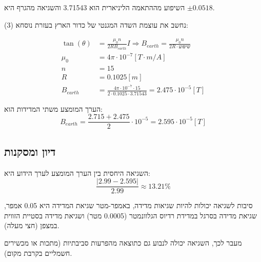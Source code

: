 \documentclass[14pt]{extarticle}
\begin{document}
השיפוע מההתאמה הליניארית הוא 3.71543 והשגיאה מהגרף היא $±0.0518$.

נחשב את עוצמת השדה המגנטי של כדור הארץ בעזרת נוסחא (3):
\begin{center}
    \begin{equation*}
        \begin{aligned}
            \tan(\theta) & = \frac{\mu_0 n}{2R B_{earth}}I \Rightarrow B_{earth} = \frac{\mu_0 n}{2R \cdot \text{שיפוע}} \\
            \mu_0        & = 4\pi \cdot 10^{-7} [T \cdot m/A]                                                            \\
            n            & = 15                                                                                          \\
            R            & = 0.1025 [m]                                                                                  \\
            B_{earth}    & = \frac{4\pi \cdot 10^{-7} \cdot 15}{2 \cdot 0.1025 \cdot 3.71543} = 2.475 \cdot 10^{-5} [T]
        \end{aligned}
    \end{equation*}
\end{center}

הערך המומצע משתי המדידות הוא:
\begin{equation*}
    B_{earth} = \frac{2.715 + 2.475}{2} \cdot 10^{-5} = 2.595 \cdot 10^{-5} [T]
\end{equation*}

\subsection{דיון ומסקנות}

השגיאה היחסית בין הערך המומצע לערך הידוע היא:
\begin{equation*}
    \frac{|2.99 - 2.595|}{2.99} \approx 13.21 \%
\end{equation*}

סיבות לשגיאה יכולות להיות שגיאות מדידה, באמפר-מטר שגיאת המדידה  היא 0.05 אמפר, שגיאת מדידה  בסרגל במדידת רדיוס הגלוונמטר (0.0005 מטר)
ושגיאת מדידה בסטיית הזווית במצפן (חצי מעלה).

מעבר לכך, השגיאה   יכולה לנבוע גם כתוצאה מהפרעות סביבתיות (מתכות או מכשירים חשמליים בקרבת מקום).
\end{document}
